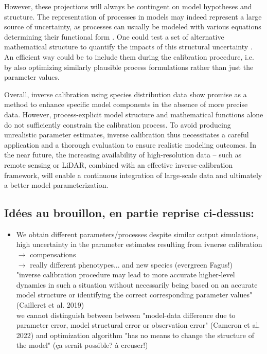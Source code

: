 \documentclass[letterpaper,8pt]{extarticle}  %
\begin{document}
\begin{doublespacing}
\begin{linenumbers}
However, these projections will always be contingent on model hypotheses and structure. The representation of processes in models may indeed represent a large source of uncertainty, as processes can usually be modeled with various equations determining their functional form \citep{Keenan2011}. One could test a set of alternative mathematical structure to quantify the impacts of this structural uncertainty \citep{Huber2020}. An efficient way could be to include them during the calibration procedure, i.e. by also optimizing similarly plausible process formulations rather than just the parameter values.


Overall, inverse calibration using species distribution data show promise as a method to enhance specific model components in the absence of more precise data. However, process-explicit model structure and mathematical functions alone do not sufficiently constrain the calibration process. To avoid producing unrealistic parameter estimates, inverse calibration thus necessitates a careful application and a thorough evaluation to ensure realistic modeling outcomes. In the near future, the increasing availability of high-resolution data -- such as remote sensing or LiDAR, combined with an effective inverse-calibration framework, will enable a continuous integration of large-scale data and ultimately a better model parameterization.


\subsection{Idées au brouillon, en partie reprise ci-dessus:}

\begin{itemize}

\item We obtain different parameters/processes despite similar output simulations, high uncertainty in the parameter estimates resulting from ivnerse calibration
$\rightarrow$ compensations \\
$\rightarrow$ really different phenotypes... and new species (evergreen Fagus!)\\
"inverse calibration procedure may lead to more accurate higher-level dynamics in such a situation without necessarily being based on an accurate model structure or identifying the correct corresponding parameter values" (Cailleret et al. 2019) \\
we cannot distinguish between between "model-data difference due to parameter error, model structural error or observation error" (Cameron et al. 2022) and optimization algorithm "has no means to change the structure of the model" (ça serait possible? à creuser!)


\end{itemize}
\end{linenumbers}
\end{doublespacing}
\end{document}
